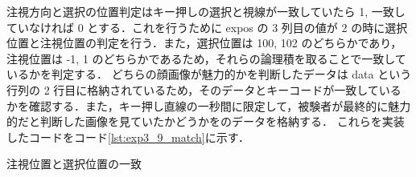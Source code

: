 \documentclass[dvipdfmx, titlepage, t]{jsarticle}
\begin{document}
    注視方向と選択の位置判定はキー押しの選択と視線が一致していたら 1, 一致していなければ 0 とする．これを行うために expos の 3 列目の値が 2 の時に選択位置と注視位置の判定を行う．また，選択位置は 100, 102 のどちらかであり，注視位置は -1, 1 のどちらかであるため，それらの論理積を取ることで一致しているかを判定する． どちらの顔画像が魅力的かを判断したデータは data という行列の 2 行目に格納されているため，そのデータとキーコードが一致しているかを確認する．また，キー押し直線の一秒間に限定して，被験者が最終的に魅力的だと判断した画像を見ていたかどうかをのデータを格納する．
    これらを実装したコードをコード\ref{lst:exp3_9_match}に示す．
    \begin{program}[H]
        \caption{注視位置と選択位置の一致}
        \inputminted[linenos,
        firstline=60,
        lastline=76,
        frame=lines,
        fontsize = \small]{matlab}{code/Exp3_9_Matlab.m}
        \label{lst:exp3_9_match}
    \end{program}
\end{document}
